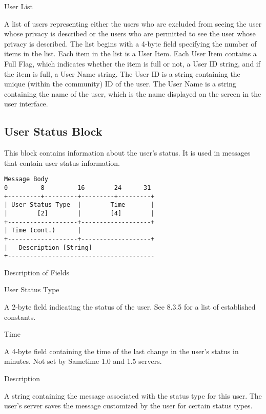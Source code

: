 \documentclass[titlepage,oneside]{book}
\begin{document}
\par{} User List
\par{}   A list of users representing either the users who are excluded from
  seeing the user whose privacy is described or the users who are
  permitted to see the user whose privacy is described. The list
  begins with a 4-byte field specifying the number of items in the
  list. Each item in the list is a User Item. Each User Item contains
  a Full Flag, which indicates whether the item is full or not, a User
  ID string, and if the item is full, a User Name string.
  The User ID is a string containing the unique (within the community)
  ID of the user. The User Name is a string containing the name of the
  user, which is the name displayed on the screen in the user
  interface.

\subsection{User Status Block}

\par{} This block contains information about the user's status. It is
used in messages that contain user status information.

\begin{verbatim}
Message Body
0         8         16        24      31
+---------+---------+---------+---------+
| User Status Type  |        Time       |
|        [2]        |        [4]        |
+-------------------+-------------------+
| Time (cont.)      |
+-------------------+-------------------+
|   Description [String]
+----------------------------------------
\end{verbatim}

\par{} Description of Fields

\par{} User Status Type
\par{}   A 2-byte field indicating the status of the user. See 
  8.3.5 for a list of established constants.

\par{} Time
\par{}   A 4-byte field containing the time of the last change in the user's
  status in minutes. Not set by Sametime 1.0 and 1.5 servers.

\par{} Description
\par{}   A string containing the message associated with the status type for
  this user. The user's server saves the message customized by the user
  for certain status types.
\end{document}
